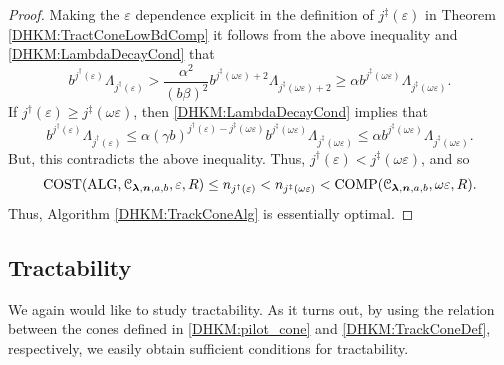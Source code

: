 \documentclass[USenglish]{article}
\theoremstyle{dgthm}
\theoremstyle{dgthm}
\theoremstyle{dgthm}
\theoremstyle{dgthm}
\theoremstyle{dgdef}
\theoremstyle{definition}
\DeclareMathOperator{\DHKMALG}{ALG}
\DeclareMathOperator{\DHKMCOST}{COST}
\DeclareMathOperator{\DHKMCOMP}{COMP}
\begin{document}
\begin{proof}
Making the $\varepsilon$ dependence explicit in the definition of $j^\ddagger(\varepsilon)$ in Theorem \ref{DHKM:TractConeLowBdComp} it follows from the above inequality and \eqref{DHKM:LambdaDecayCond} that
\begin{equation*}
    b^{j^\dagger(\varepsilon)} \Lambda_{j^\dagger(\varepsilon) } 
     > \frac{\alpha^2}{(b\beta)^2} b^{j^\ddagger(\omega\varepsilon)+2} \Lambda_{j^\ddagger(\omega \varepsilon) + 2 } 
    \ge \alpha b^{j^\ddagger(\omega\varepsilon)} \Lambda_{j^\ddagger(\omega \varepsilon)}.
\end{equation*}
If $j^{\dagger}(\varepsilon) \ge j^{\ddagger}(\omega \varepsilon)$, then \eqref{DHKM:LambdaDecayCond} implies that 
\[
 b^{j^\dagger(\varepsilon)} \Lambda_{j^\dagger(\varepsilon) } \le \alpha (\gamma b)^{j^{\dagger}(\varepsilon) - j^{\ddagger}(\omega \varepsilon)} b^{j^{\ddagger}(\omega \varepsilon) } \Lambda_{j^\ddagger(\omega \varepsilon) } \le \alpha b^{j^{\ddagger}(\omega \varepsilon) } \Lambda_{j^\ddagger(\omega \varepsilon) }.
\]
But, this contradicts the above inequality.  Thus, $j^\dagger(\varepsilon) < j^\ddagger(\omega \varepsilon)$, and so
\[
\DHKMCOST(\DHKMALG,\calC_{\boldsymbol{\lambda},\bsn,a,b},\varepsilon,R) \le n_{j^\dagger(\varepsilon)} < n_{j^\ddagger(\omega \varepsilon)} < \DHKMCOMP(\calC_{\boldsymbol{\lambda},\bsn,a,b},\omega \varepsilon,R).
\]
Thus,  Algorithm \ref{DHKM:TrackConeAlg} is essentially optimal.
\end{proof}




\subsection{Tractability}\label{DHKM:SecDecayTract}



We again would like to study tractability. As it turns out, by using the relation 
between the cones defined in \eqref{DHKM:pilot_cone} and \eqref{DHKM:TrackConeDef}, respectively, we 
easily obtain sufficient conditions for tractability. 
\end{document}
